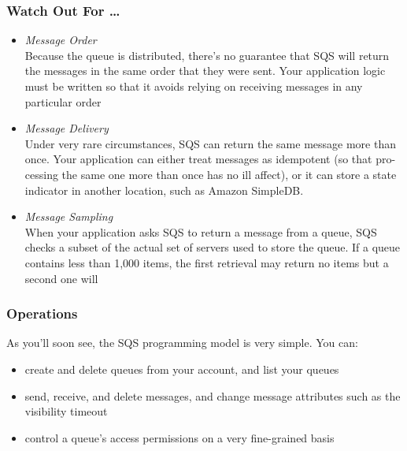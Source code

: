 \documentclass{beamer}
\begin{document}
\begin{frame}
\frametitle{Watch Out For \dots}
\begin{itemize}
\item \emph{Message Order}\\Because the queue is distributed, there’s no guarantee that SQS will return the
messages in the same order that they were sent. Your application logic must be
written so that it avoids relying on receiving messages in any particular order
\item \emph{Message Delivery}\\ Under very rare circumstances, SQS can return the same message more than
once. Your application can either treat messages as idempotent (so that pro-
cessing the same one more than once has no ill affect), or it can store a state
indicator in another location, such as Amazon SimpleDB.
\item \emph{Message Sampling}\\When your application asks SQS to return a message from a queue, SQS checks
a subset of the actual set of servers used to store the queue. If a queue contains
less than 1,000 items, the first retrieval may return no items but a second one
will
\end{itemize}
\end{frame}
\begin{frame}[fragile]
\frametitle{Operations}
As you’ll soon see, the SQS programming model is very simple. You can:
\begin{itemize}
\item create and delete queues from your account, and list your queues
\item send, receive, and delete messages, and change message attributes such as the
visibility timeout
\item control a queue’s access permissions on a very fine-grained basis
\end{itemize}
\end{frame}
\end{document}

